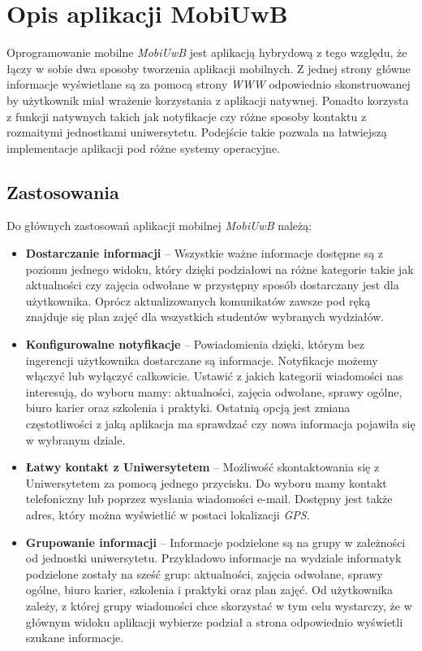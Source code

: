 \documentclass{iiuwb}
\begin{document}
\section{Opis aplikacji MobiUwB}
Oprogramowanie mobilne \textit{MobiUwB} jest aplikacją hybrydową z tego względu, że łączy w sobie dwa sposoby tworzenia aplikacji mobilnych. Z jednej strony główne informacje wyświetlane są za pomocą strony \textit{WWW} odpowiednio skonstruowanej by użytkownik miał wrażenie korzystania z aplikacji natywnej. Ponadto korzysta z funkcji natywnych takich jak notyfikacje czy różne sposoby kontaktu z rozmaitymi jednostkami uniwersytetu. Podejście takie pozwala na łatwiejszą implementacje aplikacji pod różne systemy operacyjne.
\subsection{Zastosowania}
Do głównych zastosowań aplikacji mobilnej \textit{MobiUwB} należą:
\begin{itemize}
\item \textbf{Dostarczanie informacji} -- Wszystkie ważne informacje dostępne są z poziomu jednego widoku, który dzięki podziałowi na różne kategorie takie jak aktualności czy zajęcia odwołane w przystępny sposób dostarczany jest dla użytkownika. Oprócz aktualizowanych komunikatów zawsze pod ręką znajduje się plan zajęć dla wszystkich studentów wybranych wydziałów.
\item \textbf{Konfigurowalne notyfikacje} -- Powiadomienia dzięki, którym bez ingerencji użytkownika dostarczane są informacje. Notyfikacje możemy włączyć lub wyłączyć całkowicie. Ustawić z jakich kategorii wiadomości nas interesują, do wyboru mamy: aktualności, zajęcia odwołane, sprawy ogólne, biuro karier oraz szkolenia i praktyki. Ostatnią opcją jest zmiana częstotliwości z jaką aplikacja ma sprawdzać czy nowa informacja pojawiła się w wybranym dziale.
\item \textbf{Łatwy kontakt z Uniwersytetem} -- Możliwość skontaktowania się z Uniwersytetem za pomocą jednego przycisku. Do wyboru mamy kontakt telefoniczny lub poprzez wysłania wiadomości e-mail. Dostępny jest także adres, który można wyświetlić w postaci lokalizacji \textit{GPS}.
\item \textbf{Grupowanie informacji} -- Informacje podzielone są na grupy w zależności od jednostki uniwersytetu. Przykładowo informacje na wydziale  informatyk podzielone zostały na sześć grup: aktualności, zajęcia odwołane, sprawy ogólne, biuro karier, szkolenia i praktyki oraz plan zajęć. Od użytkownika zależy, z której grupy wiadomości chce skorzystać w tym celu wystarczy, że w głównym widoku aplikacji wybierze podział a strona odpowiednio wyświetli szukane informacje.
\end{itemize}
\end{document}

